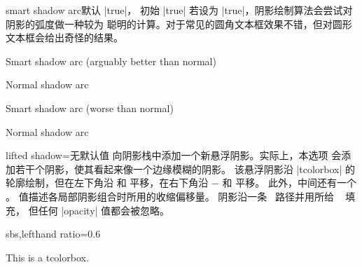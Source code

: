 \clearpage
\begin{docTcbKey}[][doc new=2015-05-05]{smart shadow arc}{}{默认 |true|，
  初始 |true|}
若设为 |true|，阴影绘制算法会尝试对阴影的弧度做一种较为
聪明的计算。对于常见的圆角文本框效果不错，但对圆形文本框会给出奇怪的结果。

\begin{dispExample}

\begin{tcolorbox}
Smart shadow arc (arguably better than normal)
\end{tcolorbox}
\hfill
\begin{tcolorbox}[smart shadow arc=false, drop shadow]
Normal shadow arc
\end{tcolorbox}
\hfill
\begin{tcolorbox}
Smart shadow arc (worse than normal)
\end{tcolorbox}
\hfill
\begin{tcolorbox}[circular arc, smart shadow arc=false, drop shadow]
Normal shadow arc
\end{tcolorbox}
\end{dispExample}
\end{docTcbKey}


\begin{docTcbKey}{lifted shadow}{=}{无默认值}
  向阴影栈中添加一个新悬浮阴影。实际上，本选项
  会添加若干个阴影，使其看起来像一个边缘模糊的阴影。
  该悬浮阴影沿 |tcolorbox| 的轮廓绘制，但在左下角沿
   和  平移，在右下角沿
  $-$ 和  平移。
  此外，中间还有一个 。
   值描述各局部阴影组合时所用的收缩偏移量。
  阴影沿一条 \tikzname\ 路径并用所给 \tikzname\  填充，
  但任何 |opacity| 值都会被忽略。
\begin{dispExample*}{sbs,lefthand ratio=0.6}

\begin{tcolorbox}[title=My own shadow,
  lifted shadow={1mm}{-2mm}{3mm}{0.1mm}%
               {black!50!white}]
This is a tcolorbox.
\end{tcolorbox}
\end{dispExample*}
\end{docTcbKey}

